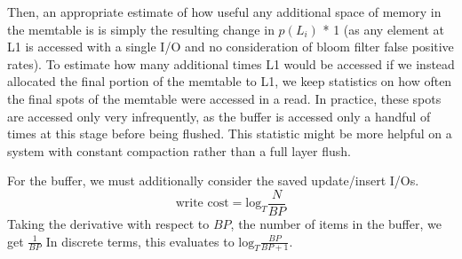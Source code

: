 \documentclass{sig-alternate-05-2015}
\begin{document}
Then, an appropriate estimate of how useful any additional space of memory in the memtable is is simply the resulting change in $p(L_i)$ * 1 (as any element at L1 is accessed with a single I/O and no consideration of bloom filter false positive rates). To estimate how many additional times L1 would be accessed if we instead allocated the final portion of the memtable to L1, we keep statistics on how often the final spots of the memtable were accessed in a read. In practice, these spots are accessed only very infrequently, as the buffer is accessed only a handful of times at this stage before being flushed. This statistic might be more helpful on a system with constant compaction rather than a full layer flush.

For the buffer, we must additionally consider the saved update/insert I/Os. 
$$
 \text{write cost} = \textrm{log}_{T} \frac{N}{BP}
$$
Taking the derivative with respect to $BP$, the number of items in the buffer, we get $\frac{1}{BP}$
In discrete terms, this evaluates to $\textrm{log}_{T} \frac{BP}{BP+1}$. 
\end{document}
